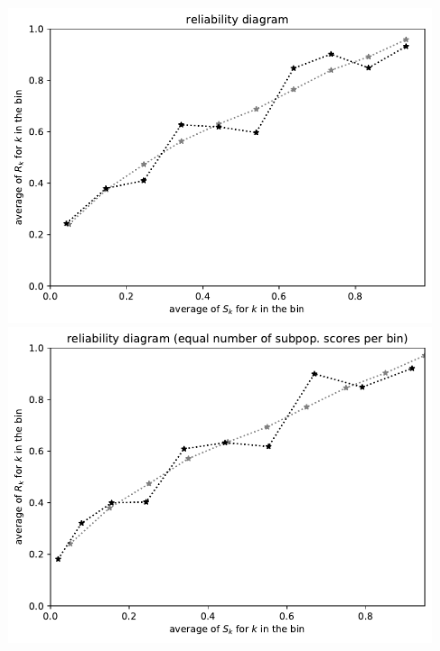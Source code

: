\documentclass{article}
\begin{document}
\begin{figure}
\begin{centering}
\parbox{\imsize}{\includegraphics[width=\imsize]
                {./codes/unweighted/50000_3300_10_2/equiscore.pdf}}
\quad\quad
\parbox{\imsize}{\includegraphics[width=\imsize]
                {./codes/unweighted/50000_3300_10_2/equisamps.pdf}}

\vspace{\vertsep}


\end{centering}
\end{figure}
\end{document}
